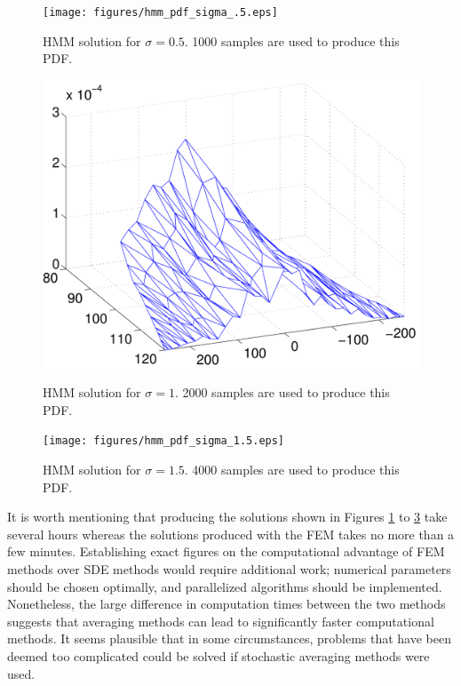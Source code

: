 \begin{figure}
\begin{center}
\texttt{[image: figures/hmm\_pdf\_sigma\_.5.eps]}
\end{center}
\caption{HMM solution for $\sigma = 0.5$. 1000 samples are used to produce this PDF.}
\label{f:hmm sigma=.5}
\end{figure}

\begin{figure}
\begin{center}
\label{f:hmm sigma=1}
\includegraphics[width=\textwidth]{figures/hmm_pdf_sigma_1}
\end{center}
\caption{HMM solution for $\sigma = 1$. 2000 samples are used to produce this PDF.}
\end{figure}

\begin{figure}
\begin{center}
\texttt{[image: figures/hmm\_pdf\_sigma\_1.5.eps]}
\end{center}
\caption{HMM solution for $\sigma = 1.5$. 4000 samples are used to produce this PDF.}
\label{f:hmm sigma=1.5}
\end{figure}

It is worth mentioning that producing the solutions shown in Figures \ref{f:hmm sigma=.5} to \ref{f:hmm sigma=1.5} take several hours whereas the solutions produced with the FEM takes no more than a few minutes. Establishing exact figures on the computational advantage of FEM methods over SDE methods would require additional work; numerical parameters should be chosen optimally, and parallelized algorithms should be implemented. Nonetheless, the large difference in computation times between the two methods suggests that averaging methods can lead to significantly faster computational methods. It seems plausible that in some circumstances, problems that have been deemed too complicated could be solved if stochastic averaging methods were used.

